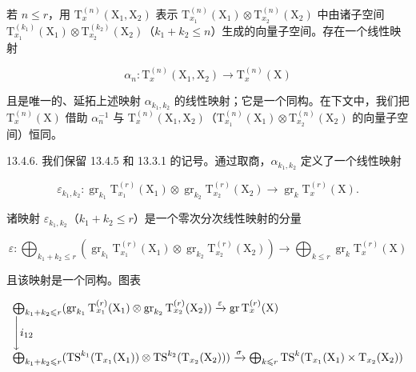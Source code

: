 若 \(n \leqslant r\)，用 \(\mathrm{T}_{x}^{(n)}(\mathrm{X}_{1}, \mathrm{X}_{2})\) 表示 \(\mathrm{T}_{x_{1}}^{(n)}(\mathrm{X}_{1}) \otimes \mathrm{T}_{x_{2}}^{(n)}(\mathrm{X}_{2})\) 中由诸子空间 \(\mathrm{T}_{x_{1}}^{(k_{1})}(\mathrm{X}_{1}) \otimes \mathrm{T}_{x_{2}}^{(k_{2})}(\mathrm{X}_{2})\)（\(k_{1} + k_{2} \leqslant n\)）生成的向量子空间。存在一个线性映射

\[
\alpha_ {n} \colon \mathrm{T} _ {x} ^ {(n)} (\mathrm{X} _ {1}, \mathrm{X} _ {2}) \rightarrow \mathrm{T} _ {x} ^ {(n)} (\mathrm{X})
\]

且是唯一的、延拓上述映射 \(\alpha_{k_1,k_2}\) 的线性映射；它是一个同构。在下文中，我们把 \(\mathrm{T}_x^{(n)}(\mathrm{X})\) 借助 \(\alpha_n^{-1}\) 与 \(\mathrm{T}_x^{(n)}(\mathrm{X}_1,\mathrm{X}_2)\)（\(\mathrm{T}_{x_1}^{(n)}(\mathrm{X}_1)\otimes \mathrm{T}_{x_2}^{(n)}(\mathrm{X}_2)\) 的向量子空间）恒同。

13.4.6. 我们保留 13.4.5 和 13.3.1 的记号。通过取商，\(\alpha_{k_1,k_2}\) 定义了一个线性映射

\[
\varepsilon_ {k _ {1}, k _ {2}} \colon \operatorname{gr} _ {k _ {1}} \mathrm{T} _ {x _ {1}} ^ {(r)} (\mathrm{X} _ {1}) \otimes \operatorname{gr} _ {k _ {2}} \mathrm{T} _ {x _ {2}} ^ {(r)} (\mathrm{X} _ {2}) \rightarrow \operatorname{gr} _ {k} \mathrm{T} _ {x} ^ {(r)} (\mathrm{X}).
\]

诸映射 \(\varepsilon_{k_1,k_2}\)（\(k_1 + k_2 \leqslant r\)）是一个零次分次线性映射的分量

\[
\varepsilon : \bigoplus_ {k _ {1} + k _ {2} \leqslant r} \left(\operatorname{gr} _ {k _ {1}} \mathrm{T} _ {x _ {1}} ^ {(r)} (\mathrm{X} _ {1}) \otimes \operatorname{gr} _ {k _ {2}} \mathrm{T} _ {x _ {2}} ^ {(r)} (\mathrm{X} _ {2})\right)\rightarrow \bigoplus_ {k \leqslant r} \operatorname{gr} _ {k} \mathrm{T} _ {x} ^ {(r)} (\mathrm{X})
\]

且该映射是一个同构。图表

\[
\begin{array}{l} \bigoplus_ {k _ {1} + k _ {2} \leqslant r} (\operatorname{gr} _ {k _ {1}} \mathrm{T} _ {x _ {1}} ^ {(r)} (\mathrm{X} _ {1}) \otimes \operatorname{gr} _ {k _ {2}} \mathrm{T} _ {x _ {2}} ^ {(r)} (\mathrm{X} _ {2})) \xrightarrow {\varepsilon} \operatorname{gr} \mathrm{T} _ {x} ^ {(r)} (\mathrm{X}) \\ \Biggl \downarrow i _ {1 2} \\ \bigoplus_ {k _ {1} + k _ {2} \leqslant r} (\mathrm{TS} ^ {k _ {1}} (\mathrm{T} _ {x _ {1}} (\mathrm{X} _ {1})) \otimes \mathrm{TS} ^ {k _ {2}} (\mathrm{T} _ {x _ {2}} (\mathrm{X} _ {2}))) \xrightarrow {\sigma} \bigoplus_ {k \leqslant r} \mathrm{TS} ^ {k} (\mathrm{T} _ {x _ {1}} (\mathrm{X} _ {1}) \times \mathrm{T} _ {x _ {2}} (\mathrm{X} _ {2})) \end{array}
\]

